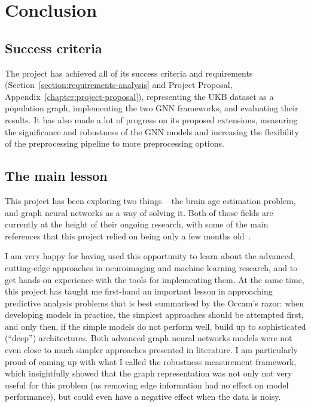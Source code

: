 \chapter{Conclusion}



\section{Success criteria}
The project has achieved all of its success criteria and requirements (Section~\ref{section:requirements-analysis} and Project Proposal, Appendix~\ref{chapter:project-proposal}), representing the UKB dataset as a population graph, implementing the two GNN frameworks, and evaluating their results. It has also made a lot of progress on its proposed extensions, measuring the significance and robustness of the GNN models and increasing the flexibility of the preprocessing pipeline to more preprocessing options.

\section{The main lesson}
This project has been exploring two things – the brain age estimation problem, and graph neural networks as a way of solving it. Both of those fields are currently at the height of their ongoing research, with some of the main references that this project relied on being only a few months old~\cite{kaufmann2019, niu2019improved, pervaiz2020optimising}.

I am very happy for having used this opportunity to learn about the advanced, cutting-edge approaches in neuroimaging and machine learning research, and to get hands-on experience with the tools for implementing them. At the same time, this project has taught me first-hand an important lesson in approaching predictive analysis problems that is best summarised by the Occam's razor: when developing models in practice, the simplest approaches should be attempted first, and only then, if the simple models do not perform well, build up to sophisticated (``deep'') architectures. Both advanced graph neural networks models were not even close to much simpler approaches presented in literature. I am particularly proud of coming up with what I called the robustness measurement framework, which insightfully showed that the graph representation was not only not very useful for this problem (as removing edge information had no effect on model performance), but could even have a negative effect when the data is noisy.

